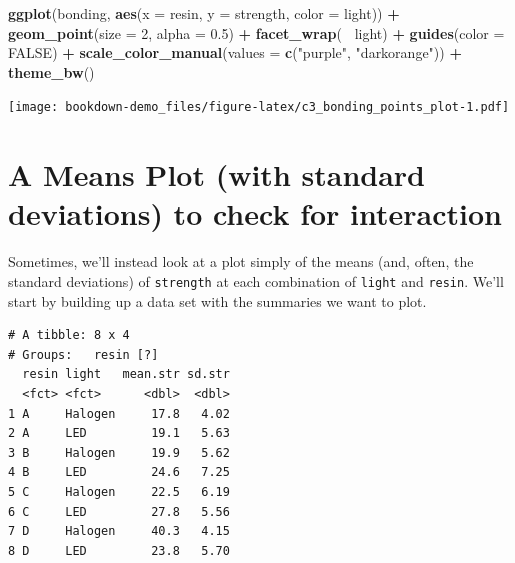 \documentclass[]{book}
\newenvironment{Shaded}{\begin{snugshade}}{\end{snugshade}}
\newcommand{\KeywordTok}[1]{\textcolor[rgb]{0.13,0.29,0.53}{\textbf{#1}}}
\newcommand{\DataTypeTok}[1]{\textcolor[rgb]{0.13,0.29,0.53}{#1}}
\newcommand{\DecValTok}[1]{\textcolor[rgb]{0.00,0.00,0.81}{#1}}
\newcommand{\FloatTok}[1]{\textcolor[rgb]{0.00,0.00,0.81}{#1}}
\newcommand{\StringTok}[1]{\textcolor[rgb]{0.31,0.60,0.02}{#1}}
\newcommand{\OtherTok}[1]{\textcolor[rgb]{0.56,0.35,0.01}{#1}}
\newcommand{\OperatorTok}[1]{\textcolor[rgb]{0.81,0.36,0.00}{\textbf{#1}}}
\newcommand{\NormalTok}[1]{#1}
\theoremstyle{definition}
\theoremstyle{definition}
\theoremstyle{definition}
\theoremstyle{remark}
\begin{document}
\begin{Shaded}
\begin{Highlighting}[]
\KeywordTok{ggplot}\NormalTok{(bonding, }\KeywordTok{aes}\NormalTok{(}\DataTypeTok{x =}\NormalTok{ resin, }\DataTypeTok{y =}\NormalTok{ strength, }\DataTypeTok{color =}\NormalTok{ light)) }\OperatorTok{+}
\StringTok{    }\KeywordTok{geom_point}\NormalTok{(}\DataTypeTok{size =} \DecValTok{2}\NormalTok{, }\DataTypeTok{alpha =} \FloatTok{0.5}\NormalTok{) }\OperatorTok{+}
\StringTok{    }\KeywordTok{facet_wrap}\NormalTok{(}\OperatorTok{~}\StringTok{ }\NormalTok{light) }\OperatorTok{+}
\StringTok{    }\KeywordTok{guides}\NormalTok{(}\DataTypeTok{color =} \OtherTok{FALSE}\NormalTok{) }\OperatorTok{+}
\StringTok{    }\KeywordTok{scale_color_manual}\NormalTok{(}\DataTypeTok{values =} \KeywordTok{c}\NormalTok{(}\StringTok{"purple"}\NormalTok{, }\StringTok{"darkorange"}\NormalTok{)) }\OperatorTok{+}
\StringTok{    }\KeywordTok{theme_bw}\NormalTok{() }
\end{Highlighting}
\end{Shaded}

\texttt{[image: bookdown-demo\_files/figure-latex/c3\_bonding\_points\_plot-1.pdf]}

\section{A Means Plot (with standard deviations) to check for
interaction}\label{a-means-plot-with-standard-deviations-to-check-for-interaction}

Sometimes, we'll instead look at a plot simply of the means (and, often,
the standard deviations) of \texttt{strength} at each combination of
\texttt{light} and \texttt{resin}. We'll start by building up a data set
with the summaries we want to plot.

\begin{Shaded}
\end{Shaded}

\begin{verbatim}
# A tibble: 8 x 4
# Groups:   resin [?]
  resin light   mean.str sd.str
  <fct> <fct>      <dbl>  <dbl>
1 A     Halogen     17.8   4.02
2 A     LED         19.1   5.63
3 B     Halogen     19.9   5.62
4 B     LED         24.6   7.25
5 C     Halogen     22.5   6.19
6 C     LED         27.8   5.56
7 D     Halogen     40.3   4.15
8 D     LED         23.8   5.70
\end{verbatim}
\end{document}
